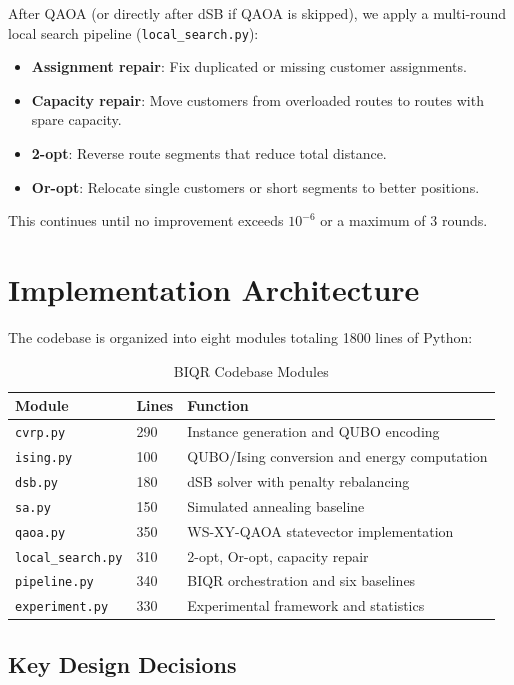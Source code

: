 \documentclass[11pt,a4paper]{article}
\theoremstyle{definition}
\begin{document}
After QAOA (or directly after dSB if QAOA is skipped), we apply a multi-round local search pipeline (\texttt{local\_search.py}):
\begin{itemize}
    \item \textbf{Assignment repair}: Fix duplicated or missing customer assignments.
    \item \textbf{Capacity repair}: Move customers from overloaded routes to routes with spare capacity.
    \item \textbf{2-opt}: Reverse route segments that reduce total distance.
    \item \textbf{Or-opt}: Relocate single customers or short segments to better positions.
\end{itemize}
This continues until no improvement exceeds $10^{-6}$ or a maximum of $3$ rounds.

\section{Implementation Architecture}\label{sec:implementation}

The codebase is organized into eight modules totaling \num{1800} lines of Python:

\begin{table}[htbp]
\centering
\caption{BIQR Codebase Modules}\label{tab:modules}
\begin{tabular}{@{}llp{6cm}@{}}
\toprule
\textbf{Module} & \textbf{Lines} & \textbf{Function} \\
\midrule
\texttt{cvrp.py} & 290 & Instance generation and QUBO encoding \\
\texttt{ising.py} & 100 & QUBO/Ising conversion and energy computation \\
\texttt{dsb.py} & 180 & dSB solver with penalty rebalancing \\
\texttt{sa.py} & 150 & Simulated annealing baseline \\
\texttt{qaoa.py} & 350 & WS-XY-QAOA statevector implementation \\
\texttt{local\_search.py} & 310 & 2-opt, Or-opt, capacity repair \\
\texttt{pipeline.py} & 340 & BIQR orchestration and six baselines \\
\texttt{experiment.py} & 330 & Experimental framework and statistics \\
\bottomrule
\end{tabular}
\end{table}

\subsection{Key Design Decisions}
\end{document}
